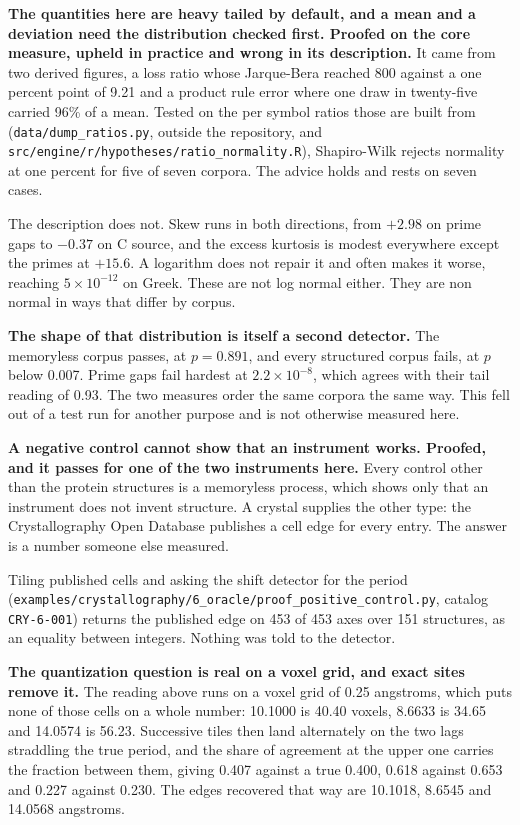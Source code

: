 \textbf{The quantities here are heavy tailed by default, and a mean and a deviation need the distribution checked first. Proofed on the core measure, upheld in practice and wrong in its description.} It came from two derived figures, a loss ratio whose Jarque-Bera reached 800 against a one percent point of 9.21 and a product rule error where one draw in twenty-five carried 96\% of a mean. Tested on the per symbol ratios those are built from (\texttt{data/\allowbreak{}dump\_\allowbreak{}ratios.\allowbreak{}py}, outside the repository, and \texttt{src/\allowbreak{}engine/\allowbreak{}r/\allowbreak{}hypotheses/\allowbreak{}ratio\_\allowbreak{}normality.\allowbreak{}R}), Shapiro-Wilk rejects normality at one percent for five of seven corpora. The advice holds and rests on seven cases.

The description does not. Skew runs in both directions, from \(+2.98\) on prime gaps to \(-0.37\) on C source, and the excess kurtosis is modest everywhere except the primes at \(+15.6\). A logarithm does not repair it and often makes it worse, reaching \(5 \times 10^{-12}\) on Greek. These are not log normal either. They are non normal in ways that differ by corpus.

\textbf{The shape of that distribution is itself a second detector.} The memoryless corpus passes, at \(p = 0.891\), and every structured corpus fails, at \(p\) below 0.007. Prime gaps fail hardest at \(2.2 \times 10^{-8}\), which agrees with their tail reading of 0.93. The two measures order the same corpora the same way. This fell out of a test run for another purpose and is not otherwise measured here.

\textbf{A negative control cannot show that an instrument works. Proofed, and it passes for one of the two instruments here.} Every control other than the protein structures is a memoryless process, which shows only that an instrument does not invent structure. A crystal supplies the other type: the Crystallography Open Database publishes a cell edge for every entry. The answer is a number someone else measured.

Tiling published cells and asking the shift detector for the period (\texttt{examples/\allowbreak{}crystallography/\allowbreak{}6\_\allowbreak{}oracle/\allowbreak{}proof\_\allowbreak{}positive\_\allowbreak{}control.\allowbreak{}py}, catalog \texttt{CRY-6-001}) returns the published edge on 453 of 453 axes over 151 structures, as an equality between integers. Nothing was told to the detector.

\textbf{The quantization question is real on a voxel grid, and exact sites remove it.} The reading above runs on a voxel grid of 0.25 angstroms, which puts none of those cells on a whole number: 10.1000 is 40.40 voxels, 8.6633 is 34.65 and 14.0574 is 56.23. Successive tiles then land alternately on the two lags straddling the true period, and the share of agreement at the upper one carries the fraction between them, giving 0.407 against a true 0.400, 0.618 against 0.653 and 0.227 against 0.230. The edges recovered that way are 10.1018, 8.6545 and 14.0568 angstroms.

